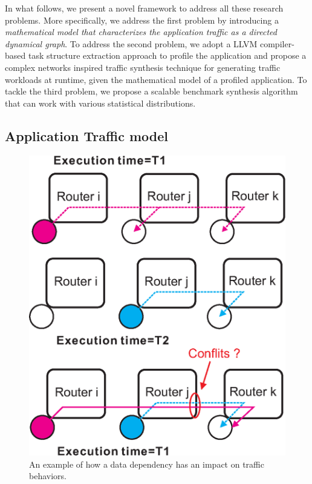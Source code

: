 In what follows, we present a novel framework to address all these research problems. More specifically, we address the first problem by introducing a \textit{mathematical model that characterizes the application traffic as a directed dynamical graph}. To address the second problem, we adopt a LLVM compiler-based task structure extraction approach to profile the application and propose a complex networks inspired traffic synthesis technique for generating traffic workloads at runtime, given the mathematical model of a profiled application. To tackle the third problem, we propose a scalable benchmark synthesis algorithm that can work with various statistical distributions.

\subsection{Application Traffic model} 
 \begin{figure}[htb]
  \centering
  \includegraphics[width=0.6\columnwidth]{router.eps}
  \vskip -2mm
  \caption{An example of how a data dependency has an impact on traffic behaviors.}
  \label{fig:router}
  \vskip -8mm
\end{figure}
